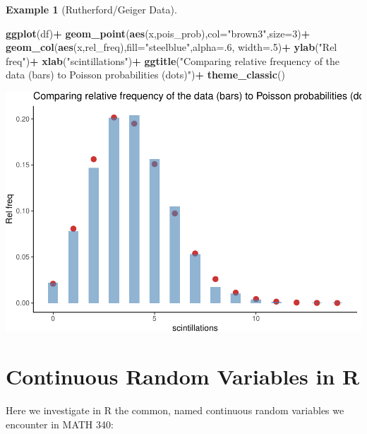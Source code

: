 \documentclass[
]{book}
\newenvironment{Shaded}{\begin{snugshade}}{\end{snugshade}}
\newcommand{\AttributeTok}[1]{\textcolor[rgb]{0.13,0.29,0.53}{#1}}
\newcommand{\DecValTok}[1]{\textcolor[rgb]{0.00,0.00,0.81}{#1}}
\newcommand{\FunctionTok}[1]{\textcolor[rgb]{0.13,0.29,0.53}{\textbf{#1}}}
\newcommand{\NormalTok}[1]{#1}
\newcommand{\SpecialCharTok}[1]{\textcolor[rgb]{0.81,0.36,0.00}{\textbf{#1}}}
\newcommand{\StringTok}[1]{\textcolor[rgb]{0.31,0.60,0.02}{#1}}
\theoremstyle{definition}
\theoremstyle{definition}
\newtheorem{example}{Example}[chapter]
\theoremstyle{definition}
\theoremstyle{definition}
\theoremstyle{remark}
\begin{document}
\begin{example}[Rutherford/Geiger Data]
\begin{Shaded}
\begin{Highlighting}[]
\FunctionTok{ggplot}\NormalTok{(df)}\SpecialCharTok{+}
  \FunctionTok{geom\_point}\NormalTok{(}\FunctionTok{aes}\NormalTok{(x,pois\_prob),}\AttributeTok{col=}\StringTok{"brown3"}\NormalTok{,}\AttributeTok{size=}\DecValTok{3}\NormalTok{)}\SpecialCharTok{+}
  \FunctionTok{geom\_col}\NormalTok{(}\FunctionTok{aes}\NormalTok{(x,rel\_freq),}\AttributeTok{fill=}\StringTok{"steelblue"}\NormalTok{,}\AttributeTok{alpha=}\NormalTok{.}\DecValTok{6}\NormalTok{, }\AttributeTok{width=}\NormalTok{.}\DecValTok{5}\NormalTok{)}\SpecialCharTok{+}
  \FunctionTok{ylab}\NormalTok{(}\StringTok{"Rel freq"}\NormalTok{)}\SpecialCharTok{+}
  \FunctionTok{xlab}\NormalTok{(}\StringTok{"scintillations"}\NormalTok{)}\SpecialCharTok{+}
  \FunctionTok{ggtitle}\NormalTok{(}\StringTok{"Comparing relative frequency of the data (bars) to Poisson probabilities (dots)"}\NormalTok{)}\SpecialCharTok{+}
  \FunctionTok{theme\_classic}\NormalTok{()}
\end{Highlighting}
\end{Shaded}

\includegraphics{math340-notes_files/figure-latex/unnamed-chunk-170-1.pdf}

\end{example}

\chapter{Continuous Random Variables in R}\label{R-continuousRV}

Here we investigate in R the common, named continuous random variables we encounter in MATH 340:
\end{document}
